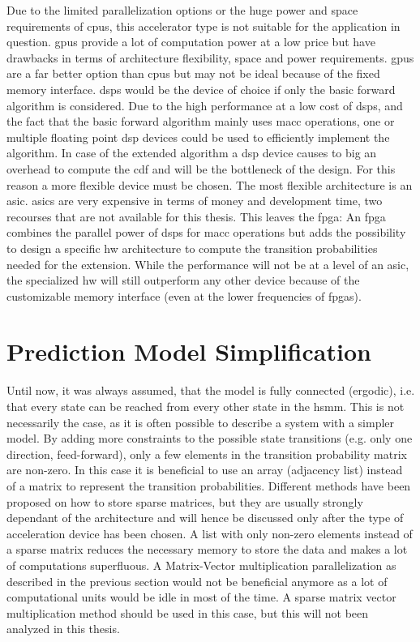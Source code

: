 \documentclass[mscthesis]{usiinfthesis}
\begin{document}
Due to the limited parallelization options or the huge power and space
requirements of \glspl{cpu}, this accelerator type is not suitable for the
application in question. \glspl{gpu} provide a lot of computation power at
a low price but have drawbacks in terms of architecture flexibility, space and
power requirements. \glspl{gpu} are a far better option than \glspl{cpu} but
may not be ideal because of the fixed memory interface. \glspl{dsp} would be
the device of choice if only the basic forward algorithm is considered. Due to
the high performance at a low cost of \glspl{dsp}, and the fact that the basic
forward algorithm mainly uses \gls{macc} operations, one or multiple floating
point \gls{dsp} devices could be used to efficiently implement the algorithm.
In case of the extended algorithm a \gls{dsp} device causes to big an overhead
to compute the \gls{cdf} and will be the bottleneck of the design.  For this
reason a more flexible device must be chosen. The most flexible architecture is
an \gls{asic}. \glspl{asic} are very expensive in terms of money and
development time, two recourses that are not available for this thesis.  This
leaves the \gls{fpga}: An \gls{fpga} combines the parallel power of \glspl{dsp}
for \gls{macc} operations but adds the possibility to design a specific
\gls{hw} architecture to compute the transition probabilities needed for the
extension. While the performance will not be at a level of an \gls{asic}, the
specialized \gls{hw} will still outperform any other device because of the
customizable memory interface (even at the lower frequencies of \glspl{fpga}).

\section{Prediction Model Simplification}
\label{ch:analysis_simple}

Until now, it was always assumed, that the model is fully connected (ergodic),
i.e. that every state can be reached from every other state in the \gls{hsmm}.
This is not necessarily the case, as it is often possible to describe a system
with a simpler model. By adding more constraints to the possible state
transitions (e.g. only one direction, feed-forward), only a few elements in the
transition probability matrix are non-zero. In this case it is beneficial to
use an array (adjacency list) instead of a matrix to represent the transition
probabilities. Different methods have been proposed on how to store sparse
matrices, but they are usually strongly dependant of the architecture and will
hence be discussed only after the type of acceleration device has been chosen.
A list with only non-zero elements instead of a sparse matrix reduces the
necessary memory to store the data and makes a lot of computations superfluous.
A Matrix-Vector multiplication parallelization as described in the previous
section would not be beneficial anymore as a lot of computational units would
be idle in most of the time. A sparse matrix vector multiplication method
should be used in this case, but this will not been analyzed in this thesis.
\end{document}
